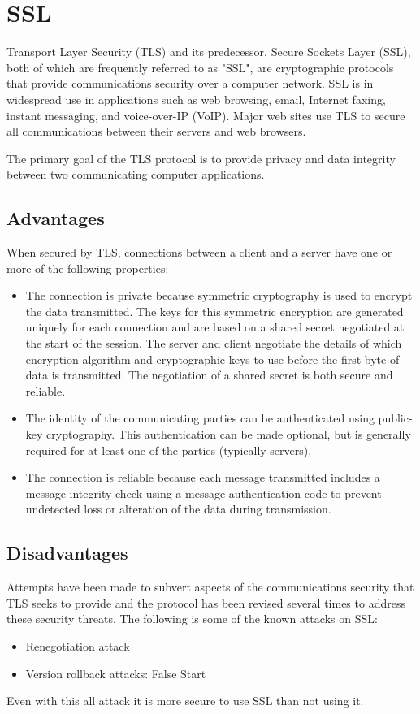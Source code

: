 \section{SSL}
\par Transport Layer Security (TLS) and its predecessor, Secure Sockets Layer (SSL), both of which are frequently referred to as "SSL", are cryptographic protocols that provide communications security over a computer network. SSL is in widespread use in applications such as web browsing, email, Internet faxing, instant messaging, and voice-over-IP (VoIP). Major web sites use TLS to secure all communications between their servers and web browsers.
\par The primary goal of the TLS protocol is to provide privacy and data integrity between two communicating computer applications.
\subsection{Advantages}
When secured by TLS, connections between a client and a server have one or more of the following properties:
\begin{itemize}
	\item The connection is private because symmetric cryptography is used to encrypt the data transmitted. The keys for this symmetric encryption are generated uniquely for each connection and are based on a shared secret negotiated at the start of the session. The server and client negotiate the details of which encryption algorithm and cryptographic keys to use before the first byte of data is transmitted. The negotiation of a shared secret is both secure and reliable.
	\item The identity of the communicating parties can be authenticated using public-key cryptography. This authentication can be made optional, but is generally required for at least one of the parties (typically servers).
	\item The connection is reliable because each message transmitted includes a message integrity check using a message authentication code to prevent undetected loss or alteration of the data during transmission.
\end{itemize}
\subsection{Disadvantages}
Attempts have been made to subvert aspects of the communications security that TLS seeks to provide and the protocol has been revised several times to address these security threats. The following is some of the known attacks on SSL:
\begin{itemize}
	\item Renegotiation attack
	\item Version rollback attacks: False Start
\end{itemize}
Even with this all attack it is more secure to use SSL than not using it.